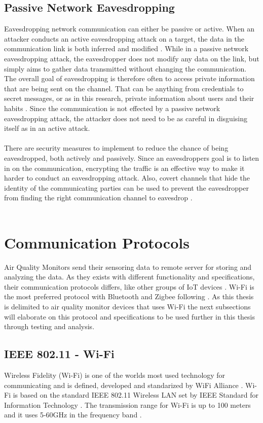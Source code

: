 \subsection{Passive Network Eavesdropping}
Eavesdropping network communication can either be passive or active. When an attacker conducts an active eavesdropping attack on a target, the data in the communication link is both inferred and modified \cite{Eavesdropping}. While in a passive network eavesdropping attack, the eavesdropper does not modify any data on the link, but simply aims to gather data transmitted without changing the communication. The overall goal of eavesdropping is therefore often to access private information that are being sent on the channel. That can be anything from credentials to secret messages, or as in this research, private information about users and their habits \cite{Eavesdropping}. Since the communication is not effected by a passive network eavesdropping attack, the attacker does not need to be as careful in disguising itself as in an active attack.  
\\\\
There are security measures to implement to reduce the chance of being eavesdropped, both actively and passively. Since an eavesdroppers goal is to listen in on the communication, encrypting the traffic is an effective way to make it harder to conduct an eavesdropping attack. Also, covert channels that hide the identity of the communicating parties can be used to prevent the eavesdropper from finding the right communication channel to eavesdrop \cite{Eavesdropping}.
\\\\
\section{Communication Protocols}
Air Quality Monitors send their sensoring data to remote server for storing and analyzing the data. As they exists with different functionality and specifications, their communication protocols differs, like other groups of IoT devices \cite{AQMBigSource}. Wi-Fi is the most preferred protocol with Bluetooth and Zigbee following \cite{saini2020indoor}. As this thesis is delimited to air quality monitor devices that uses Wi-Fi the next subsections will elaborate on this protocol and specifications to be used further in this thesis through testing and analysis. 

\subsection{IEEE 802.11 - Wi-Fi}
Wireless Fidelity (Wi-Fi) \cite{WiFiAlliance} is one of the worlds most used technology for communicating and is defined, developed and standarized by WiFi Alliance \cite{WiFiAlliance}. Wi-Fi is based on the standard IEEE 802.11 Wireless LAN set by IEEE Standard for Information Technology \cite{WifiStandard}. The transmission range for Wi-Fi is up to 100 meters and it uses 5-60GHz in the frequency band \cite{IAQMonitorCommunicationReview}.
\\\\

